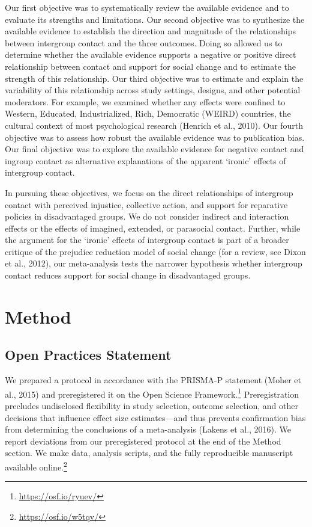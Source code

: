 \documentclass[12pt, letterpaper]{article}
\begin{document}
Our first objective was to systematically review the available evidence
and to evaluate its strengths and limitations. Our second objective was
to synthesize the available evidence to establish the direction and
magnitude of the relationships between intergroup contact and the three
outcomes. Doing so allowed us to determine whether the available
evidence supports a negative or positive direct relationship between
contact and support for social change and to estimate the strength of
this relationship. Our third objective was to estimate and explain the
variability of this relationship across study settings, designs, and
other potential moderators. For example, we examined whether any effects
were confined to Western, Educated, Industrialized, Rich, Democratic
(WEIRD) countries, the cultural context of most psychological research
(Henrich et al., 2010). Our fourth objective was to assess how robust
the available evidence was to publication bias. Our final objective was
to explore the available evidence for negative contact and ingroup
contact as alternative explanations of the apparent `ironic' effects of
intergroup contact.

In pursuing these objectives, we focus on the direct relationships of
intergroup contact with perceived injustice, collective action, and
support for reparative policies in disadvantaged groups. We do not
consider indirect and interaction effects or the effects of imagined,
extended, or parasocial contact. Further, while the argument for the
`ironic' effects of intergroup contact is part of a broader critique of
the prejudice reduction model of social change (for a review, see Dixon
et al., 2012), our meta-analysis tests the narrower hypothesis whether
intergroup contact reduces support for social change in disadvantaged
groups.

\hypertarget{method}{%
\section{Method}\label{method}}

\hypertarget{open-practices-statement}{%
\subsection{Open Practices Statement}\label{open-practices-statement}}

We prepared a protocol in accordance with the PRISMA-P statement (Moher
et al., 2015) and preregistered it on the Open Science
Framework.\footnote{\url{https://osf.io/ryuev/}} Preregistration
precludes undisclosed flexibility in study selection, outcome selection,
and other decisions that influence effect size estimates---and thus
prevents confirmation bias from determining the conclusions of a
meta-analysis (Lakens et al., 2016). We report deviations from our
preregistered protocol at the end of the Method section. We make data,
analysis scripts, and the fully reproducible manuscript available
online.\footnote{\url{https://osf.io/w5tqv/}}
\end{document}
